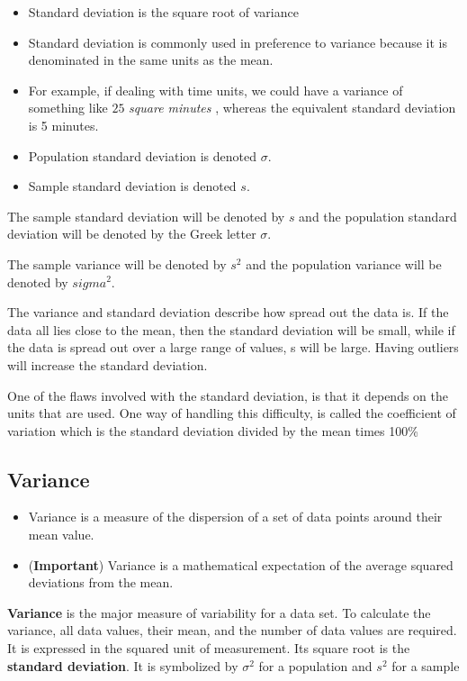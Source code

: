 \documentclass[]{report}
\begin{document}
{\begin{itemize}
\item Standard deviation is the square root of variance
\item Standard deviation is commonly used in preference to variance because it is denominated in the same units as the mean.
\item For example, if dealing with time units, we could have a variance of something like $25$ \emph{ square minutes }, whereas the equivalent standard deviation is 5 minutes.
\item Population standard deviation is denoted  $\sigma$.
\item Sample standard deviation is denoted $s$.
\end{itemize}







The sample standard deviation will be denoted by $s$ and the population standard deviation will be denoted by the Greek letter $\sigma$.

The sample variance will be denoted by $s^2$ and the population variance will be denoted by $sigma^2$.

The variance and standard deviation describe how spread out the data is.  If the data all lies close to the mean, then the standard deviation will be small, while if the data is spread out over a large range of values, s will be large.  Having outliers will increase the standard deviation.

One of the flaws involved with the standard deviation, is that it depends on the units that are used.  One way of handling this difficulty, is called the coefficient of variation which is the standard deviation divided by the mean times 100\%


\subsection{Variance}


\begin{itemize}
\item Variance is a measure of the dispersion of a set of data points around their mean value. 
\item (\textbf{Important}) Variance is a mathematical expectation of the average squared
deviations from the mean.
\end{itemize}


\textbf{Variance} is the major measure of variability for a data set. To calculate the variance, all data values, their mean, and the number of data values are required. It is expressed in the squared unit of measurement. Its square root is the \textbf{standard deviation}. It is symbolized by $\sigma^2$ for a population and $s^2$ for a sample

}
\end{document}
